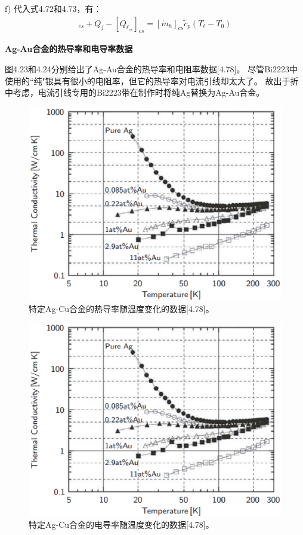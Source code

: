 f) 代入式4.72和4.73，有：
\begin{align*}%
[Q_\ell]_{cs}+Q_j-[Q_{\ell_{cs}}]_{cs}=[\dot{m}_h]_{cs}\tilde{c}_p(T_\ell-T_0) \tag{4.74}
\end{align*}

\textbf{Ag-Au合金的热导率和电导率数据}

图4.23和4.24分别给出了Ag-Au合金的热导率和电阻率数据[4.78]。
尽管Bi2223中使用的``纯"银具有很小的电阻率，但它的热导率对电流引线却太大了。
故出于折中考虑，电流引线专用的Bi2223带在制作时将纯Ag替换为Ag-Au合金。

\begin{figure}[htbp]
	\centering
	\includegraphics[scale=0.7]{chpt4/figs/fig4.23.eps}
	\caption{特定Ag-Cu合金的热导率随温度变化的数据[4.78]。}
\end{figure}
\begin{figure}[htbp]
	\centering
	\includegraphics[scale=0.7]{chpt4/figs/fig4.23.eps}
	\caption{特定Ag-Cu合金的电导率随温度变化的数据[4.78]。}
\end{figure}

